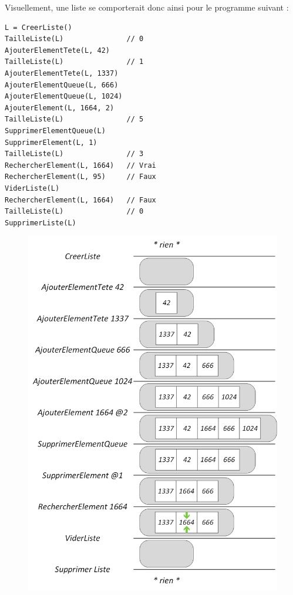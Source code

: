 \documentclass[11pt,a4paper]{article}
\begin{document}
\clearpage

Visuellement, une liste se comporterait donc ainsi pour le programme suivant :

\begin{center}
\begin{lstlisting}[style=algorithmique]
L = CreerListe()
TailleListe(L)               // 0
AjouterElementTete(L, 42)
TailleListe(L)               // 1
AjouterElementTete(L, 1337)
AjouterElementQueue(L, 666)
AjouterElementQueue(L, 1024)
AjouterElement(L, 1664, 2)
TailleListe(L)               // 5
SupprimerElementQueue(L)
SupprimerElement(L, 1)
TailleListe(L)               // 3
RechercherElement(L, 1664)   // Vrai
RechercherElement(L, 95)     // Faux
ViderListe(L)
RechercherElement(L, 1664)   // Faux
TailleListe(L)               // 0
SupprimerListe(L) \end{lstlisting}


\begin{figure}[ht!]
\centering
\centerline{  %
\includegraphics[scale=0.7]{img/listes/Listes_exemple1bis.png}
}
\end{figure}

\end{center}
\end{document}
